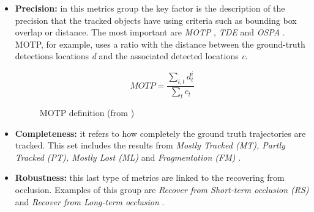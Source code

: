 \begin{itemize}
    \item \textbf{Precision:} in this metrics group the key factor is the description of the precision that the tracked objects have using criteria such as bounding box overlap or distance. The most important are \textit{MOTP} \cite{bernardin2008evaluating}, \textit{TDE} \cite{kratz2010tracking} and \textit{OSPA} \cite{ristic2011metric}. MOTP, for example, uses a ratio with the distance between the ground-truth detections locations \textit{d} and the associated detected locations \textit{c}.
    \begin{figure}[H]
    \begin{center}
    \begin{equation}
        MOTP=\frac{\sum_{i,t}{d^i_t} }{\sum_t{c_t}}
    \end{equation}
    \caption{MOTP definition (from \cite{bernardin2008evaluating})}
    \label{fig:motp}
    \end{center}
    \end{figure}
    \item \textbf{Completeness:} it refers to how completely the ground truth trajectories are tracked. This set includes the results from \textit{Mostly Tracked (MT), Partly Tracked (PT), Mostly Lost (ML)} and \textit{Fragmentation (FM)} \cite{li2009learning}.
    \item \textbf{Robustness:} this last type of metrics are linked to the recovering from occlusion. Examples of this group are \textit{Recover from Short-term occlusion (RS)} and \textit{Recover from Long-term occlusion} \cite{song2010stochastic}.
\end{itemize}

